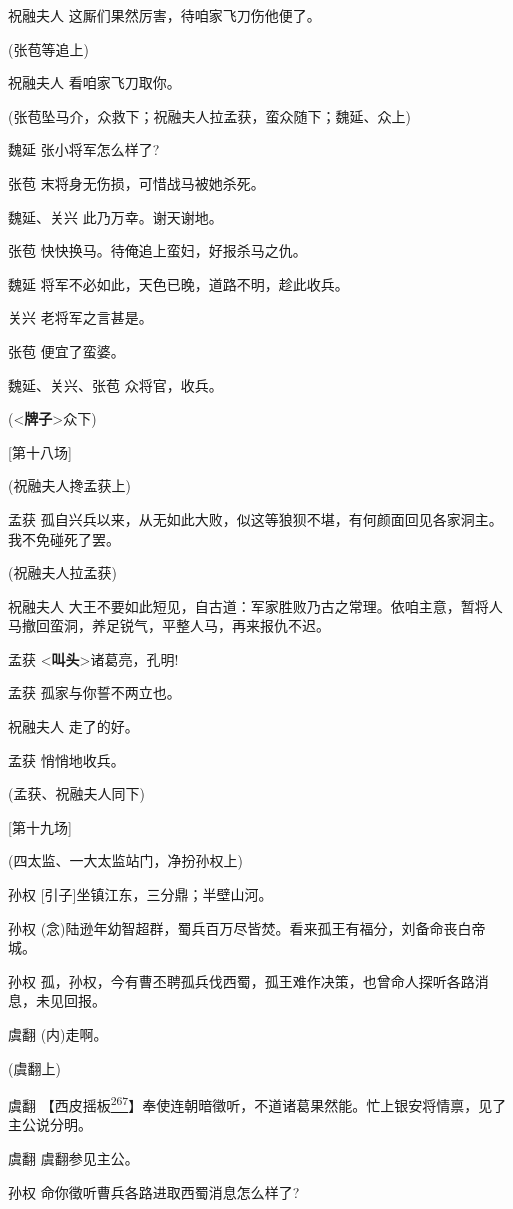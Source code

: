 祝融夫人 这厮们果然厉害，待咱家飞刀伤他便了。

(张苞等追上)

祝融夫人 看咱家飞刀取你。

(张苞坠马介，众救下；祝融夫人拉孟获，蛮众随下；魏延、众上)

魏延 张小将军怎么样了?

张苞 末将身无伤损，可惜战马被她杀死。

魏延、关兴 此乃万幸。谢天谢地。

张苞 快快换马。待俺追上蛮妇，好报杀马之仇。

魏延 将军不必如此，天色已晚，道路不明，趁此收兵。

关兴 老将军之言甚是。

张苞 便宜了蛮婆。

魏延、关兴、张苞 众将官，收兵。

(\textless{}\textbf{牌子}\textgreater{}众下)

{[}第十八场{]}

(祝融夫人搀孟获上)

孟获
孤自兴兵以来，从无如此大败，似这等狼狈不堪，有何颜面回见各家洞主。我不免碰死了罢。

(祝融夫人拉孟获)

祝融夫人
大王不要如此短见，自古道：军家胜败乃古之常理。依咱主意，暂将人马撤回蛮洞，养足锐气，平整人马，再来报仇不迟。

孟获 \textless{}\textbf{叫头}\textgreater{}诸葛亮，孔明!

孟获 孤家与你誓不两立也。

祝融夫人 走了的好。

孟获 悄悄地收兵。

(孟获、祝融夫人同下)

{[}第十九场{]}

(四太监、一大太监站门，净扮孙权上)

孙权 {[}引子{]}坐镇江东，三分鼎；半壁山河。

孙权
(念)陆逊年幼智超群，蜀兵百万尽皆焚。看来孤王有福分，刘备命丧白帝城。

孙权
孤，孙权，今有曹丕聘孤兵伐西蜀，孤王难作决策，也曾命人探听各路消息，未见回报。

虞翻 (内)走啊。

(虞翻上)

虞翻
【西皮摇板\protect\hyperlink{fn267}{\textsuperscript{267}}】奉使连朝暗徵听，不道诸葛果然能。忙上银安将情禀，见了主公说分明。

虞翻 虞翻参见主公。

孙权 命你徵听曹兵各路进取西蜀消息怎么样了?

